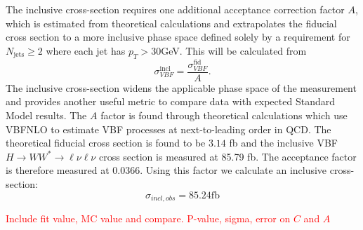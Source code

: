 The inclusive cross-section requires one additional acceptance correction factor $A$, which is estimated from theoretical calculations and extrapolates the fiducial cross section to a more inclusive phase space defined solely by a requirement for $N_{\text{jets}}\geq2$ where each jet has $p_T>30$GeV. This will be calculated from
\begin{equation}
\sigma_{VBF}^{\text{incl}} = \frac{\sigma_{VBF}^{\text{fid}}}{A}.
\end{equation}
The inclusive cross-section widens the applicable phase space of the measurement and provides another useful metric to compare data with expected Standard Model results. The $A$ factor is found through theoretical calculations which use VBFNLO to estimate VBF processes at next-to-leading order in QCD. The theoretical fiducial cross section is found to be $3.14$ fb and the inclusive VBF $H\rightarrow WW^*\rightarrow \ell\nu\ell\nu$ cross section is measured at 85.79 fb. The acceptance factor is therefore measured at $0.0366$. Using this factor we calculate an inclusive cross-section:
\begin{equation}
\sigma_{incl,obs} = 85.24 \text{fb}
\end{equation} 

\textcolor{red}{Include fit value, MC value and compare. P-value, sigma, error on $C$ and $A$}


